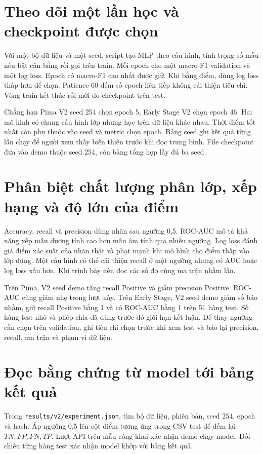 \section{Theo dõi một lần học và checkpoint được chọn}
Với một bộ dữ liệu và một seed, script tạo MLP theo cấu hình, tính trọng số mẫu nếu bật cân bằng rồi gọi  trên train. Mỗi epoch cho một macro-F1 validation và một log loss. Epoch có macro-F1 cao nhất được giữ. Khi bằng điểm, dùng log loss thấp hơn để chọn. Patience 60 đếm số epoch liên tiếp không cải thiện tiêu chí. Vòng train kết thúc rồi mới đo checkpoint trên test.



Chẳng hạn Pima V2 seed 254 chọn epoch 5, Early Stage V2 chọn epoch 46. Hai mô hình có chung cấu hình lớp nhưng học trên dữ liệu khác nhau. Thời điểm tốt nhất còn phụ thuộc vào seed và metric chọn epoch. Bảng seed ghi kết quả từng lần chạy để người xem thấy biến thiên trước khi đọc trung bình. File checkpoint đưa vào demo thuộc seed 254, còn bảng tổng hợp lấy đủ ba seed.

\section{Phân biệt chất lượng phân lớp, xếp hạng và độ lớn của điểm}
Accuracy, recall và precision dùng nhãn sau ngưỡng 0,5. ROC-AUC mô tả khả năng xếp mẫu dương tính cao hơn mẫu âm tính qua nhiều ngưỡng. Log loss đánh giá điểm xác suất của nhãn thật và phạt mạnh khi mô hình cho điểm thấp vào lớp đúng. Một cấu hình có thể cải thiện recall ở một ngưỡng nhưng có AUC hoặc log loss xấu hơn. Khi trình bày nên đọc các số đo cùng ma trận nhầm lẫn.



Trên Pima, V2 seed demo tăng recall Positive và giảm precision Positive. ROC-AUC cũng giảm nhẹ trong lượt này. Trên Early Stage, V2 seed demo giảm số báo nhầm, giữ recall Positive bằng 1 và có ROC-AUC bằng 1 trên 51 hàng test. Số hàng test nhỏ và phép chia đã dùng trước đó giới hạn kết luận. Để thay ngưỡng cần chọn trên validation, ghi tiêu chí chọn trước khi xem test và báo lại precision, recall, ma trận và phạm vi dữ liệu.

\section{Đọc bằng chứng từ model tới bảng kết quả}
Trong \nolinkurl{results/v2/experiment.json}, tìm bộ dữ liệu, phiên bản, seed 254, epoch và hash. Áp ngưỡng 0,5 lên cột điểm tương ứng trong CSV test để đếm lại \(TN,FP,FN,TP\). Lượt API trên mẫu công khai xác nhận demo chạy model. Đối chiếu từng hàng test xác nhận model khớp với bảng kết quả.

